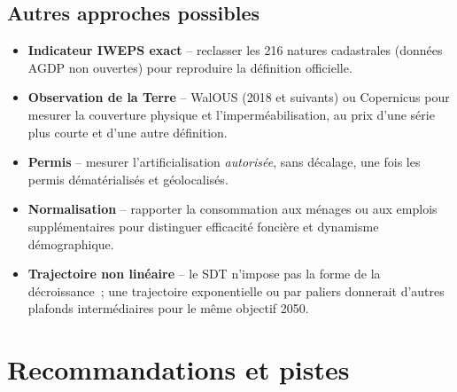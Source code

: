 \documentclass[11pt,a4paper]{report}
\begin{document}
\section{Autres approches possibles}
\begin{itemize}
\item \textbf{Indicateur IWEPS exact} -- reclasser les 216 natures cadastrales (données AGDP non ouvertes) pour reproduire la définition officielle.
\item \textbf{Observation de la Terre} -- WalOUS (2018 et suivants) ou Copernicus pour mesurer la couverture physique et l'imperméabilisation, au prix d'une série plus courte et d'une autre définition.
\item \textbf{Permis} -- mesurer l'artificialisation \emph{autorisée}, sans décalage, une fois les permis dématérialisés et géolocalisés.
\item \textbf{Normalisation} -- rapporter la consommation aux ménages ou aux emplois supplémentaires pour distinguer efficacité foncière et dynamisme démographique.
\item \textbf{Trajectoire non linéaire} -- le SDT n'impose pas la forme de la décroissance~; une trajectoire exponentielle ou par paliers donnerait d'autres plafonds intermédiaires pour le même objectif 2050.
\end{itemize}

\chapter{Recommandations et pistes}
\label{ch:reco}
\end{document}
